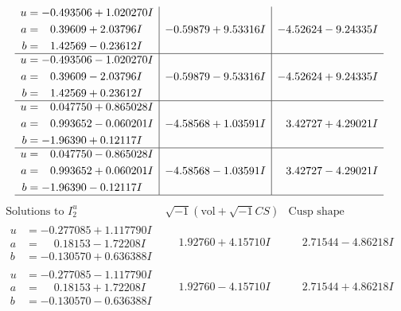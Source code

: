 \documentclass[1p]{elsarticle_modified}
\theoremstyle{definition}
\newcommand{\I}{\sqrt{-1}}
\begin{document}
$$\begin{array}{c|c|c}
\begin{aligned}
u &= -0.493506 + 1.020270 I \\
a &= \phantom{-}0.39609 + 2.03796 I \\
b &= \phantom{-}1.42569 - 0.23612 I\end{aligned}
 & -0.59879 + 9.53316 I & -4.52624 - 9.24335 I \\ \hline\begin{aligned}
u &= -0.493506 - 1.020270 I \\
a &= \phantom{-}0.39609 - 2.03796 I \\
b &= \phantom{-}1.42569 + 0.23612 I\end{aligned}
 & -0.59879 - 9.53316 I & -4.52624 + 9.24335 I \\ \hline\begin{aligned}
u &= \phantom{-}0.047750 + 0.865028 I \\
a &= \phantom{-}0.993652 - 0.060201 I \\
b &= -1.96390 + 0.12117 I\end{aligned}
 & -4.58568 + 1.03591 I & \phantom{-}3.42727 + 4.29021 I \\ \hline\begin{aligned}
u &= \phantom{-}0.047750 - 0.865028 I \\
a &= \phantom{-}0.993652 + 0.060201 I \\
b &= -1.96390 - 0.12117 I\end{aligned}
 & -4.58568 - 1.03591 I & \phantom{-}3.42727 - 4.29021 I\\
 \hline 
 \end{array}$$\newpage$$\begin{array}{c|c|c}  
\text{Solutions to }I^u_{2}& \I (\text{vol} + \sqrt{-1}CS) & \text{Cusp shape}\\
 \hline 
\begin{aligned}
u &= -0.277085 + 1.117790 I \\
a &= \phantom{-}0.18153 - 1.72208 I \\
b &= -0.130570 + 0.636388 I\end{aligned}
 & \phantom{-}1.92760 + 4.15710 I & \phantom{-}2.71544 - 4.86218 I \\ \hline\begin{aligned}
u &= -0.277085 - 1.117790 I \\
a &= \phantom{-}0.18153 + 1.72208 I \\
b &= -0.130570 - 0.636388 I\end{aligned}
 & \phantom{-}1.92760 - 4.15710 I & \phantom{-}2.71544 + 4.86218 I \\ \hline\begin{aligned}

\end{aligned}
\end{array}$$
\end{document}
